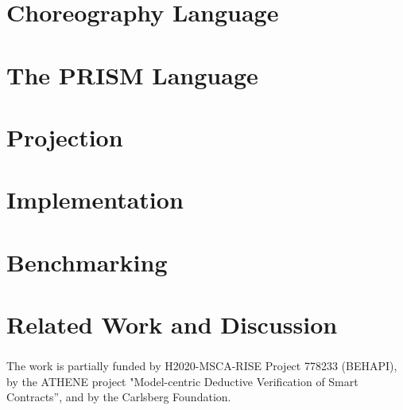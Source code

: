 \documentclass[runningheads]{llncs}
\begin{document}
\section{Choreography Language}\label{sec:chor}


\section{The PRISM Language}\label{sec:prism}


\section{Projection}\label{sec:proj}


\section{Implementation}

\section{Benchmarking}


\section{Related Work and Discussion}


\begin{credits}
  \subsubsection{\ackname} The work is partially funded by
  H2020-MSCA-RISE Project 778233 (BEHAPI), by the ATHENE project
  "Model-centric Deductive Verification of Smart Contracts”, and by
  the Carlsberg Foundation.
\end{credits}



% 
\end{document}

